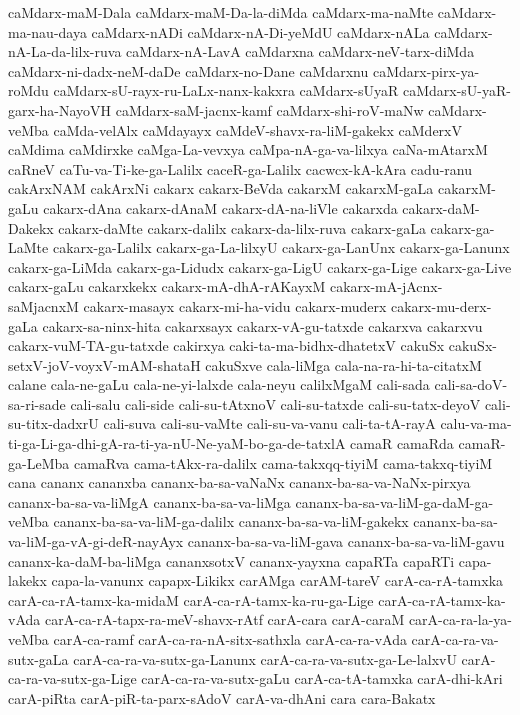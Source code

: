 {caMdarx-maM-Dala
caMdarx-maM-Da-la-diMda
caMdarx-ma-naMte
caMdarx-ma-nau-daya
caMdarx-nADi
caMdarx-nA-Di-yeMdU
caMdarx-nALa
caMdarx-nA-La-da-lilx-ruva
caMdarx-nA-LavA
caMdarxna
caMdarx-neV-tarx-diMda
caMdarx-ni-dadx-neM-daDe
caMdarx-no-Dane
caMdarxnu
caMdarx-pirx-ya-roMdu
caMdarx-sU-rayx-ru-LaLx-nanx-kakxra
caMdarx-sUyaR
caMdarx-sU-yaR-garx-ha-NayoVH
caMdarx-saM-jacnx-kamf
caMdarx-shi-roV-maNw
caMdarx-veMba
caMda-velAlx
caMdayayx
caMdeV-shavx-ra-liM-gakekx
caMderxV
caMdima
caMdirxke
caMga-La-vevxya
caMpa-nA-ga-va-lilxya
caNa-mAtarxM
caRneV
caTu-va-Ti-ke-ga-Lalilx
caceR-ga-Lalilx
cacwcx-kA-kAra
cadu-ranu
cakArxNAM
cakArxNi
cakarx
cakarx-BeVda
cakarxM
cakarxM-gaLa
cakarxM-gaLu
cakarx-dAna
cakarx-dAnaM
cakarx-dA-na-liVle
cakarxda
cakarx-daM-Dakekx
cakarx-daMte
cakarx-dalilx
cakarx-da-lilx-ruva
cakarx-gaLa
cakarx-ga-LaMte
cakarx-ga-Lalilx
cakarx-ga-La-lilxyU
cakarx-ga-LanUnx
cakarx-ga-Lanunx
cakarx-ga-LiMda
cakarx-ga-Lidudx
cakarx-ga-LigU
cakarx-ga-Lige
cakarx-ga-Live
cakarx-gaLu
cakarxkekx
cakarx-mA-dhA-rAKayxM
cakarx-mA-jAcnx-saMjacnxM
cakarx-masayx
cakarx-mi-ha-vidu
cakarx-muderx
cakarx-mu-derx-gaLa
cakarx-sa-ninx-hita
cakarxsayx
cakarx-vA-gu-tatxde
cakarxva
cakarxvu
cakarx-vuM-TA-gu-tatxde
cakirxya
caki-ta-ma-bidhx-dhatetxV
cakuSx
cakuSx-setxV-joV-voyxV-mAM-shataH
cakuSxve
cala-liMga
cala-na-ra-hi-ta-citatxM
calane
cala-ne-gaLu
cala-ne-yi-lalxde
cala-neyu
calilxMgaM
cali-sada
cali-sa-doV-sa-ri-sade
cali-salu
cali-side
cali-su-tAtxnoV
cali-su-tatxde
cali-su-tatx-deyoV
cali-su-titx-dadxrU
cali-suva
cali-su-vaMte
cali-su-va-vanu
cali-ta-tA-rayA
calu-va-ma-ti-ga-Li-ga-dhi-gA-ra-ti-ya-nU-Ne-yaM-bo-ga-de-tatxlA
camaR
camaRda
camaR-ga-LeMba
camaRva
cama-tAkx-ra-dalilx
cama-takxqq-tiyiM
cama-takxq-tiyiM
cana
cananx
cananxba
cananx-ba-sa-vaNaNx
cananx-ba-sa-va-NaNx-pirxya
cananx-ba-sa-va-liMgA
cananx-ba-sa-va-liMga
cananx-ba-sa-va-liM-ga-daM-ga-veMba
cananx-ba-sa-va-liM-ga-dalilx
cananx-ba-sa-va-liM-gakekx
cananx-ba-sa-va-liM-ga-vA-gi-deR-nayAyx
cananx-ba-sa-va-liM-gava
cananx-ba-sa-va-liM-gavu
cananx-ka-daM-ba-liMga
cananxsotxV
cananx-yayxna
capaRTa
capaRTi
capa-lakekx
capa-la-vanunx
capapx-Likikx
carAMga
carAM-tareV
carA-ca-rA-tamxka
carA-ca-rA-tamx-ka-midaM
carA-ca-rA-tamx-ka-ru-ga-Lige
carA-ca-rA-tamx-ka-vAda
carA-ca-rA-tapx-ra-meV-shavx-rAtf
carA-cara
carA-caraM
carA-ca-ra-la-ya-veMba
carA-ca-ramf
carA-ca-ra-nA-sitx-sathxla
carA-ca-ra-vAda
carA-ca-ra-va-sutx-gaLa
carA-ca-ra-va-sutx-ga-Lanunx
carA-ca-ra-va-sutx-ga-Le-lalxvU
carA-ca-ra-va-sutx-ga-Lige
carA-ca-ra-va-sutx-gaLu
carA-ca-tA-tamxka
carA-dhi-kAri
carA-piRta
carA-piR-ta-parx-sAdoV
carA-va-dhAni
cara
cara-Bakatx
}
